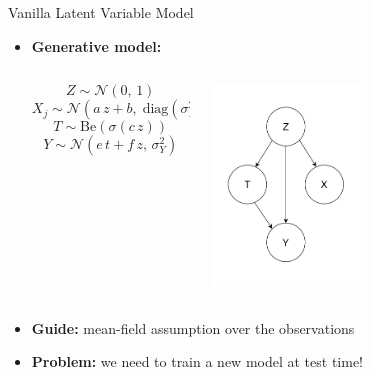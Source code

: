 \documentclass[10pt]{beamer}
\begin{document}
 \begin{frame}{Vanilla Latent Variable Model}
     \begin{itemize}
         \item \textbf{Generative model:}
         \begin{columns}
              \begin{column}{0.75\textwidth}
                  \begin{equation*}
                    Z \sim \mathcal{N}(0,\,1)
                  \end{equation*}
                  \begin{equation*}
                    X_j \sim \mathcal{N}(a\,z + b,\; \text{diag}(\sigma_X^2))
                  \end{equation*}
                  \begin{equation*}
                    T \sim \mathrm{Be}(\sigma(c\,z))
                  \end{equation*}
                  \begin{equation*}
                    Y \sim \mathcal{N}(e\,t + f\,z,\,\sigma_Y^2)
                  \end{equation*}
              \end{column}
              \begin{column}{0.5\textwidth}
                  \includegraphics[width=0.5\textwidth]{images/model.jpg}
              \end{column}
         \end{columns}

         \item \textbf{Guide:} mean-field assumption over the observations
          \item \alert{\textbf{Problem:}} we need to train a new model at test time!
     \end{itemize}
 \end{frame}
\end{document}
